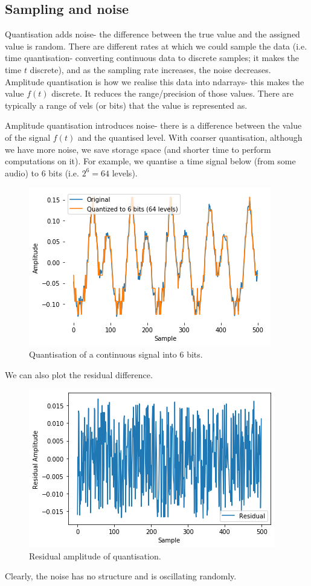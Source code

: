 \documentclass[a4paper, openany]{memoir}
\begin{document}
\subsection{Sampling and noise}
Quantisation adds noise- the difference between the true value and the assigned value is random. There are different rates at which we could sample the data (i.e. time quantisation- converting continuous data to discrete samples; it makes the time $t$ discrete), and as the sampling rate increases, the noise decreases. Amplitude quantisation is how we realise this data into ndarrays- this makes the value $f(t)$ discrete. It reduces the range/precision of those values. There are typically a range of vels (or bits) that the value is represented as.

Amplitude quantisation introduces noise- there is a difference between the value of the signal $f(t)$ and the quantised level. With coarser quantisation, although we have more noise, we save storage space (and shorter time to perform computations on it). For example, we quantise a time signal below (from some audio) to 6 bits (i.e. $2^6 = 64$ levels).
\begin{figure}[H]
    \centering
    \includegraphics[scale=0.6]{src/6.1 quantised to 6 bits.png}
    \caption{Quantisation of a continuous signal into 6 bits.}
\end{figure}
\noindent We can also plot the residual difference.
\begin{figure}[H]
    \centering
    \includegraphics[scale=0.6]{src/6.2 residual amplitude.png}
    \caption{Residual amplitude of quantisation.}
\end{figure}
\noindent Clearly, the noise has no structure and is oscillating randomly.
\newpage
\end{document}
